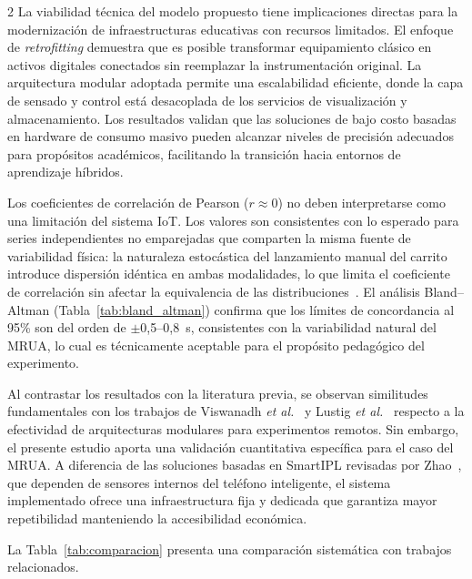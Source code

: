 \documentclass[12pt,twoside,titlepage]{ingenius}
\begin{document}
\begin{multicols}{2}
La viabilidad t\'ecnica del modelo propuesto tiene implicaciones directas para la modernizaci\'on de infraestructuras educativas con recursos limitados. El enfoque de \textit{retrofitting} demuestra que es posible transformar equipamiento cl\'asico en activos digitales conectados sin reemplazar la instrumentaci\'on original. La arquitectura modular adoptada permite una escalabilidad eficiente, donde la capa de sensado y control est\'a desacoplada de los servicios de visualizaci\'on y almacenamiento. Los resultados validan que las soluciones de bajo costo basadas en hardware de consumo masivo pueden alcanzar niveles de precisi\'on adecuados para prop\'ositos acad\'emicos, facilitando la transici\'on hacia entornos de aprendizaje h\'ibridos.

Los coeficientes de correlaci\'on de Pearson ($r \approx 0$) no deben interpretarse como una limitaci\'on del sistema IoT. Los valores son consistentes con lo esperado para series independientes no emparejadas que comparten la misma fuente de variabilidad f\'isica: la naturaleza estoc\'astica del lanzamiento manual del carrito introduce dispersi\'on id\'entica en ambas modalidades, lo que limita el coeficiente de correlaci\'on sin afectar la equivalencia de las distribuciones~\cite{giavarina2015}. El an\'alisis Bland--Altman (Tabla~\ref{tab:bland_altman}) confirma que los l\'imites de concordancia al 95\% son del orden de $\pm$0,5--0,8~s, consistentes con la variabilidad natural del MRUA, lo cual es t\'ecnicamente aceptable para el prop\'osito pedag\'ogico del experimento.

Al contrastar los resultados con la literatura previa, se observan similitudes fundamentales con los trabajos de Viswanadh \textit{et al.}~\cite{r2} y Lustig \textit{et al.}~\cite{r5} respecto a la efectividad de arquitecturas modulares para experimentos remotos. Sin embargo, el presente estudio aporta una validaci\'on cuantitativa espec\'ifica para el caso del MRUA. A diferencia de las soluciones basadas en SmartIPL revisadas por Zhao~\cite{r6}, que dependen de sensores internos del tel\'efono inteligente, el sistema implementado ofrece una infraestructura fija y dedicada que garantiza mayor repetibilidad manteniendo la accesibilidad econ\'omica.

La Tabla~\ref{tab:comparacion} presenta una comparaci\'on sistem\'atica con trabajos relacionados.


\end{multicols}
\end{document}
